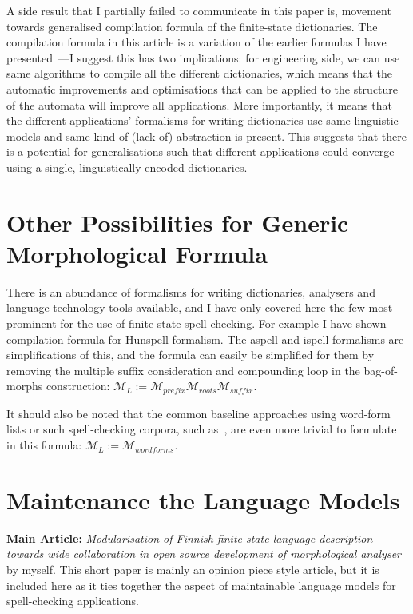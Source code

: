 \documentclass[officiallayout,draft]{unihelcompling}
\begin{document}
A side result that I partially failed to communicate in this paper is, movement
towards generalised compilation formula of the finite-state dictionaries. The
compilation formula in this article is a variation of the earlier formulas I
have presented~\citep{linden2009hfst,pirinen2010building}---I suggest this has
two implications: for engineering side, we can use same algorithms to compile
all the different dictionaries, which means that the automatic improvements and
optimisations that can be applied to the structure of the automata will improve
all applications. More importantly, it means that the different applications'
formalisms for writing dictionaries use same linguistic models and same kind of
(lack of) abstraction is present. This suggests that there is a potential for
generalisations such that different applications could converge using a single,
linguistically encoded dictionaries.

\section{Other Possibilities for Generic Morphological Formula}
\label{sec:other-lms}

There is an abundance of formalisms for writing dictionaries, analysers and
language technology tools available, and I have only covered here the few most
prominent for the use of finite-state spell-checking. For example I have shown
compilation formula for Hunspell formalism. The aspell and ispell formalisms
are simplifications of this, and the formula can easily be simplified for them
by removing the multiple suffix consideration and compounding loop in the
bag-of-morphs construction: $\mathcal{M}_L := \mathcal{M}_{prefix}
\mathcal{M}_{roots} \mathcal{M}_{suffix}$.

It should also be noted that the common baseline approaches using word-form
lists or such spell-checking corpora, such as~\citet{norvig2010howto}, are even
more trivial to formulate in this formula: $\mathcal{M}_L :=
\mathcal{M}_{wordforms}$.

\section{Maintenance the Language Models}
\label{sec:maintenance}

\textbf{Main Article:} \emph{Modularisation of Finnish finite-state language 
description—towards wide collaboration in open source development of
morphological analyser} by myself. This short paper is mainly an opinion
piece style article, but it is included here as it ties together the
aspect of maintainable language models for spell-checking applications.
\end{document}
